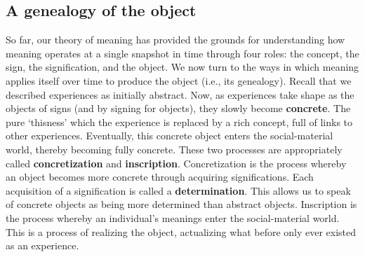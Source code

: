 

\subsection{A genealogy of the object}
So far, our theory of meaning has provided the grounds for understanding how meaning operates at a single snapshot in time through four roles: the concept, the sign, the signification, and the object.
We now turn to the ways in which meaning applies itself over time to produce the object (i.e., its genealogy). 
Recall that we described experiences as initially abstract. 
Now, as experiences take shape as the objects of signs (and by signing for objects), they slowly become \textbf{concrete}. 
The pure `thisness' which the experience is replaced by a rich concept, full of links to other experiences. 
Eventually, this concrete object enters the social-material world, thereby becoming fully concrete. 
These two processes are appropriately called \textbf{concretization} and \textbf{inscription}. 
Concretization is the process whereby an object becomes more concrete through acquiring significations. 
Each acquisition of a signification is called a \textbf{determination}. 
This allows us to speak of concrete objects as being more determined than abstract objects.
Inscription is the process whereby an individual's meanings enter  the social-material world. 
This is a process of realizing the object, actualizing what before only ever existed as an experience.

